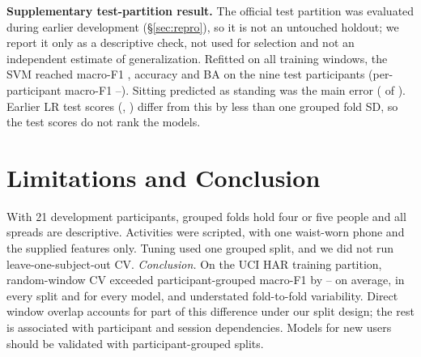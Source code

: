 \documentclass{article}
\begin{document}
\textbf{Supplementary test-partition result.} The official test partition was evaluated during earlier development (\S\ref{sec:repro}), so it is not an untouched holdout; we report it only as a descriptive check, not used for selection and not an independent estimate of generalization. Refitted on all training windows, the SVM reached macro-F1 \Ntestf, accuracy \Ntestacc{} and BA \Ntestbal{} on the nine test participants (per-participant macro-F1 \Nsubjmin--\Nsubjmax). Sitting predicted as standing was the main error (\NconfAn{} of \Nnerr). Earlier LR test scores (\Nsmoketestf, \Nrunonetestf) differ from this by less than one grouped fold SD, so the test scores do not rank the models.

\section{Limitations and Conclusion}
With 21 development participants, grouped folds hold four or five people and all spreads are descriptive. Activities were scripted, with one waist-worn phone and the supplied features only. Tuning used one grouped split, and we did not run leave-one-subject-out CV. \emph{Conclusion.} On the UCI HAR training partition, random-window CV exceeded participant-grouped macro-F1 by \Ngapmodelmin--\Ngapmodelmax{} on average, in every split and for every model, and understated fold-to-fold variability. Direct window overlap accounts for part of this difference under our split design; the rest is associated with participant and session dependencies. Models for new users should be validated with participant-grouped splits.
\end{document}
